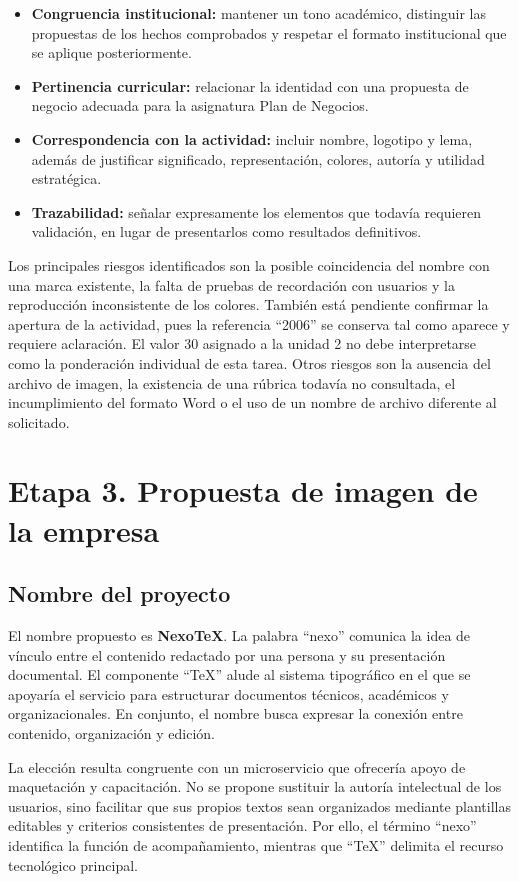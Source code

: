 \documentclass[12pt,letterpaper,oneside]{article}
\begin{document}
\begin{itemize}
\item \textbf{Congruencia institucional:} mantener un tono académico, distinguir las propuestas de los hechos comprobados y respetar el formato institucional que se aplique posteriormente.
\item \textbf{Pertinencia curricular:} relacionar la identidad con una propuesta de negocio adecuada para la asignatura Plan de Negocios.
\item \textbf{Correspondencia con la actividad:} incluir nombre, logotipo y lema, además de justificar significado, representación, colores, autoría y utilidad estratégica.
\item \textbf{Trazabilidad:} señalar expresamente los elementos que todavía requieren validación, en lugar de presentarlos como resultados definitivos.
\end{itemize}

Los principales riesgos identificados son la posible coincidencia del nombre con una marca existente, la falta de pruebas de recordación con usuarios y la reproducción inconsistente de los colores. También está pendiente confirmar la apertura de la actividad, pues la referencia ``2006'' se conserva tal como aparece y requiere aclaración. El valor 30 asignado a la unidad 2 no debe interpretarse como la ponderación individual de esta tarea. Otros riesgos son la ausencia del archivo de imagen, la existencia de una rúbrica todavía no consultada, el incumplimiento del formato Word o el uso de un nombre de archivo diferente al solicitado.

\section{Etapa 3. Propuesta de imagen de la empresa}

\subsection{Nombre del proyecto}

El nombre propuesto es \textbf{NexoTeX}. La palabra ``nexo'' comunica la idea de vínculo entre el contenido redactado por una persona y su presentación documental. El componente ``TeX'' alude al sistema tipográfico en el que se apoyaría el servicio para estructurar documentos técnicos, académicos y organizacionales. En conjunto, el nombre busca expresar la conexión entre contenido, organización y edición.

La elección resulta congruente con un microservicio que ofrecería apoyo de maquetación y capacitación. No se propone sustituir la autoría intelectual de los usuarios, sino facilitar que sus propios textos sean organizados mediante plantillas editables y criterios consistentes de presentación. Por ello, el término ``nexo'' identifica la función de acompañamiento, mientras que ``TeX'' delimita el recurso tecnológico principal.
\end{document}
